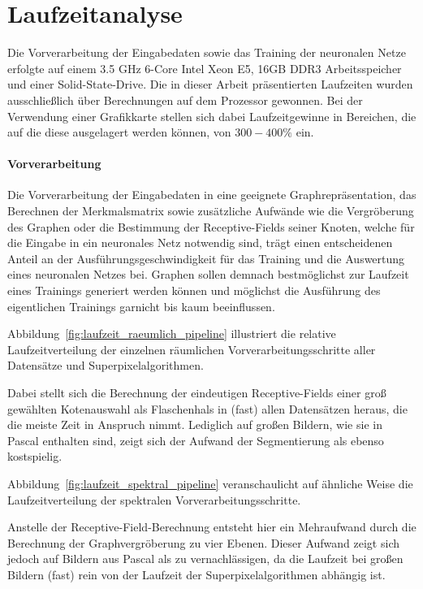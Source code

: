\section{Laufzeitanalyse}
\label{laufzeitanalyse}

Die Vorverarbeitung der Eingabedaten sowie das Training der neuronalen Netze erfolgte auf einem 3.5 GHz 6-Core Intel Xeon E5, 16GB DDR3 Arbeitsspeicher und einer Solid-State-Drive.
Die in dieser Arbeit präsentierten Laufzeiten wurden ausschließlich über Berechnungen auf dem Prozessor gewonnen.
Bei der Verwendung einer Grafikkarte stellen sich dabei Laufzeitgewinne in Bereichen, die auf die diese ausgelagert werden können, von $300 - 400 \%$ ein.

\paragraph{Vorverarbeitung}

Die Vorverarbeitung der Eingabedaten in eine geeignete Graphrepräsentation, das Berechnen der Merkmalsmatrix sowie zusätzliche Aufwände wie die Vergröberung des Graphen oder die Bestimmung der Receptive-Fields seiner Knoten, welche für die Eingabe in ein neuronales Netz notwendig sind, trägt einen entscheidenen Anteil an der Ausführungsgeschwindigkeit für das Training und die Auswertung eines neuronalen Netzes bei.
Graphen sollen demnach bestmöglichst zur Laufzeit eines Trainings generiert werden können und möglichst die Ausführung des eigentlichen Trainings garnicht bis kaum beeinflussen.

Abbildung~\ref{fig:laufzeit_raeumlich_pipeline} illustriert die relative Laufzeitverteilung der einzelnen räumlichen Vorverarbeitungsschritte \bzgl{} aller Datensätze und Superpixelalgorithmen.

Dabei stellt sich die Berechnung der eindeutigen Receptive-Fields einer groß gewählten Kotenauswahl als Flaschenhals in (fast) allen Datensätzen heraus, die die meiste Zeit in Anspruch nimmt.
Lediglich auf großen Bildern, wie sie in \gls{Pascal} enthalten sind, zeigt sich der Aufwand der Segmentierung als ebenso kostspielig.

Abbildung~\ref{fig:laufzeit_spektral_pipeline} veranschaulicht auf ähnliche Weise die Laufzeitverteilung der spektralen Vorverarbeitungsschritte.

Anstelle der Receptive-Field-Berechnung entsteht hier ein Mehraufwand durch die Berechnung der Graphvergröberung zu vier Ebenen.
Dieser Aufwand zeigt sich jedoch auf Bildern aus \gls{Pascal} als zu vernachlässigen, da die Laufzeit bei großen Bildern (fast) rein von der Laufzeit der Superpixelalgorithmen abhängig ist.

